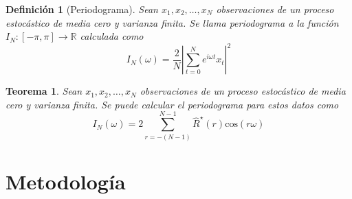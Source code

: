 \documentclass{beamer}
\newtheorem{defn}{Definici\'on}
\newtheorem{thrm}{Teorema}
\newcommand{\R}{\mathbb{R}}
\newcommand{\aste}[1]{\widehat{ #1 }^{\star}}
\newcommand{\COS}[1]{\mathrm{cos}\left( #1 \right)}
\newcommand{\abso}[1]{\left| #1 \right|}
\begin{document}
\begin{frame}%
\begin{defn}[Periodograma]
Sean $x_1, x_2 , \dots, x_N$ observaciones de un proceso estoc\'astico de media cero y varianza
finita. Se llama periodograma a la funci\'on $I_N: [-\pi,\pi] \rightarrow \R$ calculada como
\begin{equation*}
I_N(\omega) = \frac{2}{N} \abso{ \sum_{t=0}^{N} e^{i \omega t} x_t }^{2}
\end{equation*}
\end{defn}
%
%
\begin{thrm}
Sean $x_1, x_2 , \dots, x_N$ observaciones de un proceso estoc\'astico de media cero y varianza
finita. Se puede calcular el periodograma para estos datos como
\begin{equation*}
I_N(\omega) = 2 \sum_{r = -(N-1)}^{N-1} \aste{R}(r) \COS{r \omega}
\end{equation*}
\end{thrm}
\end{frame}


\begin{frame}%

\end{frame}


%


\section{Metodolog\'ia}
\end{document}
